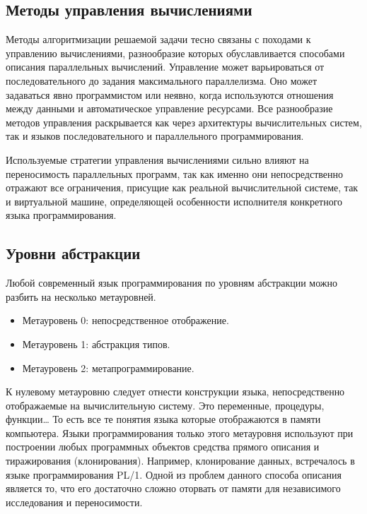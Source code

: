 \subsection{Методы управления вычислениями}

Методы алгоритмизации решаемой задачи тесно связаны с походами к управлению вычислениями, разнообразие которых обуславливается способами описания параллельных вычислений. Управление может варьироваться от последовательного до задания максимального параллелизма. Оно может задаваться явно программистом или неявно, когда используются отношения между данными и автоматическое управление ресурсами. Все разнообразие методов управления раскрывается как через архитектуры вычислительных систем, так и языков последовательного и параллельного программирования.

Используемые стратегии управления вычислениями сильно влияют на переносимость параллельных программ, так как именно они непосредственно отражают все ограничения, присущие как реальной вычислительной системе, так и виртуальной машине, определяющей особенности исполнителя конкретного языка программирования.


\subsection{Уровни абстракции}

Любой современный язык программирования по уровням абстракции можно разбить на несколько метауровней.

\begin{itemize}
    \item Метауровень 0: непосредственное отображение.
    \item Метауровень 1: абстракция типов.
    \item Метауровень 2: метапрограммирование.
\end{itemize}

К нулевому метауровню следует отнести конструкции языка, непосредственно отображаемые на вычислительную систему. Это переменные, процедуры, функции… То есть все те понятия языка которые отображаются в памяти компьютера. Языки программирования только этого метауровня используют при построении любых программных объектов средства прямого описания и тиражирования (клонирования). Например, клонирование данных, встречалось в языке программирования PL/1. Одной из проблем данного способа описания является то, что его достаточно сложно оторвать от памяти для независимого исследования и переносимости.

